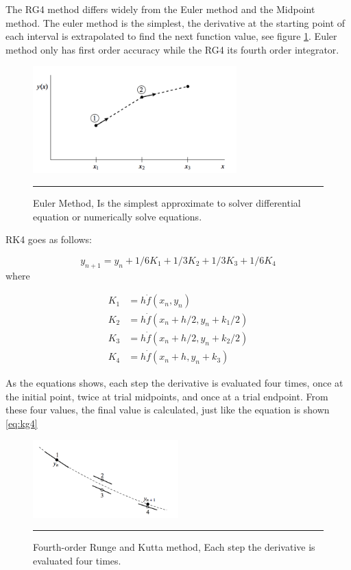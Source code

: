 The RG4 method differs widely from the Euler method and the Midpoint method. The euler method is the simplest, the derivative at the starting point of each interval is extrapolated to find the next function value, see figure \ref{fig:euler}. Euler method only has first order accuracy while the RG4 its fourth order integrator.

\begin{figure}[htbp]
	\centering
		\includegraphics[width=0.7\textwidth]{Figures/euler.png}
		\rule{35em}{0.5pt}
	\caption[Euler Method]{Euler Method, Is the simplest approximate to solver differential equation or numerically solve equations.}
	\label{fig:euler}
\end{figure}

RK4 goes as follows:

\begin{equation} \label{eq:kg4}
y_{n+1} = y_{n} + 1/6 K_{1} + 1/3 K_{2} +1/3 K_{3} + 1/6 K_{4}
\end{equation}
where

\begin{align*}
K_{1} &= h \dot f(x_{n}, y_{n}) \\
K_{2} &= h \dot f(x_{n} + h/2, y_{n} + k_{1}/2) \\
K_{3} &= h \dot f(x_{n} + h/2, y_{n} + k_{2}/2) \\
K_{4} &= h \dot f(x_{n} + h, y_{n} + k_{3})
\end{align*}

As the equations shows, each step the derivative is evaluated four times, once at the initial point, twice at trial midpoints, and once at a trial endpoint. From these four values, the final value is calculated, just like the equation is shown \ref{eq:kg4}

\begin{figure}[htbp]
	\centering
		\includegraphics[width=0.5\textwidth]{Figures/rk4.png}
		\rule{35em}{0.5pt}
	\caption[Fourth-order Runge and Kutta Method]{Fourth-order Runge and Kutta method, Each step the derivative is evaluated four times. }
	\label{fig:kutta}
\end{figure}

